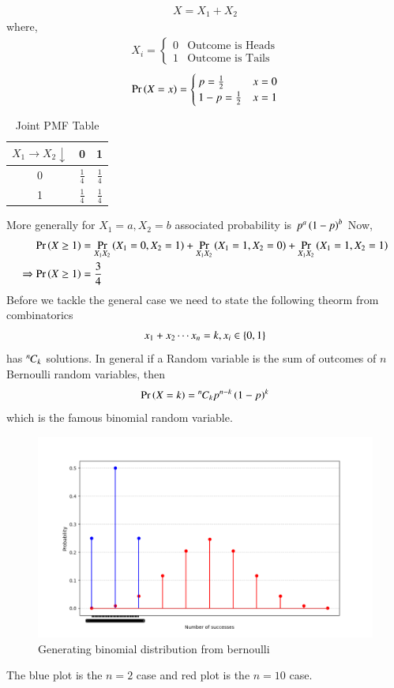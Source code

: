 \documentclass[journal]{IEEEtran}
\begin{document}
\begin{align}
  X = X_1 + X_2
\end{align}
where,
\begin{align}
	X_i = \begin{cases}
		0 & \text{Outcome is Heads}\\	
		1 & \text{Outcome is Tails}	
	\end{cases}
\end{align}
\begin{align}
  \Pr\left(X = x\right) = \begin{cases}
    p = \frac{1}{2} & x = 0\\
    1-p = \frac{1}{2} & x = 1
  \end{cases}
\end{align}
\begin{table}[htbp]
	\centering\begin{tabular}{|c|c|c|}
    \hline
		$X_1 \rightarrow X_2 \downarrow$ & 0 & 1\\
		\hline
		0 & $\frac{1}{4}$ & $\frac{1}{4}$\\
		\hline
		1 & $\frac{1}{4}$ & $\frac{1}{4}$\\
    \hline
	\end{tabular}
	\caption{Joint PMF Table}
\end{table}
More generally for $X_1 = a, X_2 = b$ associated probability is $p^a\left(1-p\right)^b$
\newline
Now, 
\begin{align}
  \Pr\left(X \ge 1\right) &= \Pr_{X_1 X_2}\left(X_1 = 0, X_2 = 1\right) + \Pr_{X_1 X_2}\left(X_1 = 1, X_2 = 0\right) + 
\Pr_{X_1 X_2}\left(X_1 = 1, X_2 = 1\right)\\
  \Rightarrow \Pr\left(X \ge 1\right) &= \frac{3}{4}\\
\end{align}
Before we tackle the general case we need to state the following theorm from combinatorics
\begin{align}
  x_1 + x_2 \cdots x_n = k, x_i \in \left\{0, 1\right\}
\end{align}
has ${{}^{n}\mkern-1muC_{k}}$ solutions.
\newline
In general if a Random variable is the sum of outcomes of $n$ Bernoulli random variables, then
\begin{align}
  \Pr\left(X = k\right) = {{}^{n}\mkern-1muC_{k}}p^{n-k}\left(1-p\right)^{k} 
\end{align}
which is the famous binomial random variable.
\begin{figure}[h!]
   \centering
   \includegraphics[width=0.7\columnwidth]{figs/binomial.png}
    \caption{Generating binomial distribution from bernoulli}
\end{figure}
The blue plot is the $n = 2$ case and red plot is the $n = 10$ case.
\end{document}

